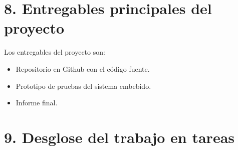 \documentclass[
11pt, %
codirector, %
]{plan}
\begin{document}
\section{8. Entregables principales del proyecto}
\label{sec:entregables}

Los entregables del proyecto son:

\begin{itemize}
	\item Repositorio en Github con el código fuente.
	\item Prototipo de pruebas del sistema embebido.
	\item Informe final.
\end{itemize}

\section{9. Desglose del trabajo en tareas}
\label{sec:wbs}
\end{document}
